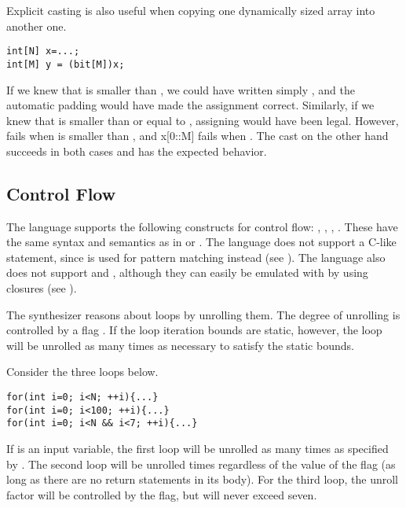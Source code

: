 \begin{Example}
Explicit casting is also useful when copying one dynamically sized array into another one.
\begin{lstlisting}
int[N] x=...;
int[M] y = (bit[M])x;
\end{lstlisting}
If we knew that  is smaller than , we could have written simply , and the automatic padding would have made the assignment correct. Similarly, if we knew that  is smaller than or equal to , assigning  would have been legal. However,  fails when  is smaller than , and x[0::M] fails when . The cast on the other hand succeeds in both cases and has the expected behavior.
\end{Example}

\subsection{Control Flow}
The language supports the following constructs for control flow: , , , . These have the same syntax and semantics as in  or . The language does not support a C-like  statement, since  is used for pattern matching instead (see ). The language also does not support  and , although they can easily be emulated with  by using closures (see ).

The synthesizer reasons about loops by unrolling them. The degree of unrolling is controlled by a flag . If the loop iteration bounds are static, however, the loop will be unrolled as many times as necessary to satisfy the static bounds. 



\begin{Example}
Consider the three loops below.
\begin{lstlisting}
for(int i=0; i<N; ++i){...}
for(int i=0; i<100; ++i){...}
for(int i=0; i<N && i<7; ++i){...}
\end{lstlisting}
If  is an input variable, the first loop will be unrolled as many times as specified by . The second loop will be unrolled  times regardless of the value of the flag (as long as there are no return statements in its body). For the third loop, the unroll factor will be controlled by the flag, but will never exceed seven.
\end{Example}



